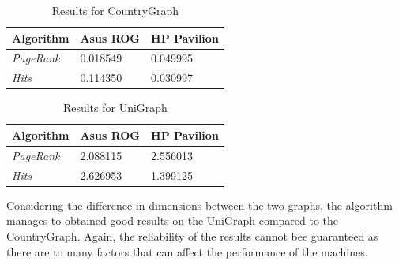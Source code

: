   \begin{table}[!ht]
    \centering
    \begin{tabular}{l|ll}
    \rowcolor[HTML]{FFFFFF} 
    \textbf{Algorithm}            & \textbf{Asus ROG}   & \textbf{HP Pavilion} \\ \hline
    \textit{PageRank}             & 0.018549  & 0.049995               \\
    \textit{Hits}                 & 0.114350  & 0.030997             \\
    \end{tabular}
    \caption{Results for CountryGraph}
  \end{table}
  \begin{table}[!ht]
    \centering
    \begin{tabular}{l|ll}
    \rowcolor[HTML]{FFFFFF} 
    \textbf{Algorithm}            & \textbf{Asus ROG}   & \textbf{HP Pavilion} \\ \hline
    \textit{PageRank}             & 2.088115 & 2.556013               \\
    \textit{Hits}                 & 2.626953 & 1.399125             \\
    \end{tabular}
    \caption{Results for UniGraph}
  \end{table}

  Considering the difference in dimensions between the two graphs, the algorithm manages to obtained 
  good results on the UniGraph compared to the CountryGraph. Again, the reliability of the results cannot 
  bee guaranteed as there are to many factors that can affect the performance of the machines.

